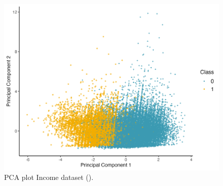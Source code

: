 \begin{figure}[ht]
    \centering
    \includegraphics[scale=0.6]{2_Figures/plot_pca_data.png}
    \caption[Data application - PCA plot Income dataset]{PCA plot Income dataset (\cite{misc_adult_2}).}
    \label{fig:pca-data}
\end{figure}
